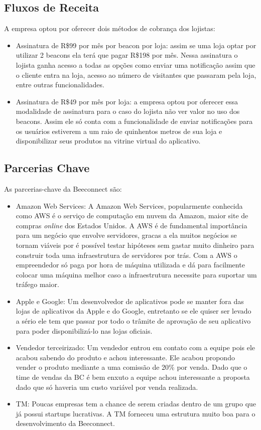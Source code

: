 \subsection{Fluxos de Receita}
\label{cha:fluxos_de_receita_canvas_bc_1}
A empresa optou por oferecer dois métodos de cobrança dos lojistas:
\begin{itemize}
\item Assinatura de R\$99 por mês por beacon por loja: assim se uma loja optar por utilizar 2 beacons ela terá que pagar R\$198 por mês. Nessa assinatura o lojista ganha acesso a todas as opções como enviar uma notificação assim que o cliente entra na loja, acesso ao número de visitantes que passaram pela loja, entre outras funcionalidades.
\item Assinatura de R\$49 por mês por loja: a empresa optou por oferecer essa modalidade de assinatura para o caso do lojista não ver valor no uso dos beacons. Assim ele só conta com a funcionalidade de enviar notificações para os usuários estiverem a um raio de quinhentos metros de sua loja e disponibilizar seus produtos na vitrine virtual do aplicativo.
\end{itemize}

\subsection{Parcerias Chave}
\label{cha:parcerias_chave}
As parcerias-chave da Beeconnect são:
\begin{itemize}
\item Amazon Web Services: A Amazon Web Services, popularmente conhecida como AWS é o serviço de computação em nuvem da Amazon, maior site de compras \textit{online} dos Estados Unidos. A AWS é de fundamental importância para um negócio que envolve servidores, gracas a ela muitos negócios se tornam viáveis por é possível testar hipóteses sem gastar muito dinheiro para construir toda uma infraestrutura de servidores por trás. Com a AWS o empreendedor só paga por hora de máquina utilizada e dá para facilmente colocar uma máquina melhor caso a infraestrutura necessite para suportar um tráfego maior.
\item Apple e Google: Um desenvolvedor de aplicativos pode se manter fora das lojas de aplicativos da Apple e do Google, entretanto se ele quiser ser levado a sério ele tem que passar por todo o trâmite de aprovação de seu aplicativo para poder disponibilizá-lo nas lojas oficiais. 
\item Vendedor terceirizado: Um vendedor entrou em contato com a equipe pois ele acabou sabendo do produto e achou interessante. Ele acabou propondo vender o produto mediante a uma comissão de 20\% por venda. Dado que o time de vendas da BC é bem enxuto a equipe achou interessante a proposta dado que só haveria um custo variável por venda realizada.
\item TM: Poucas empresas tem a chance de serem criadas dentro de um grupo que já possui startups lucrativas. A TM forneceu uma estrutura muito boa para o desenvolvimento da Beeconnect.
\end{itemize}

